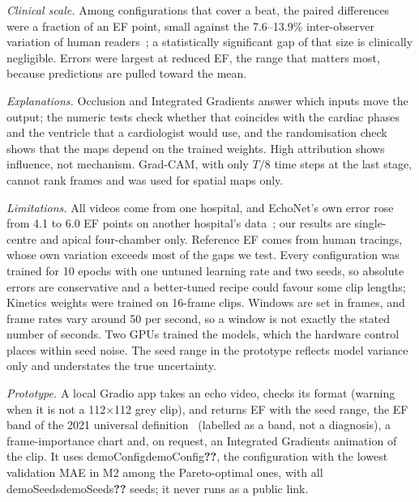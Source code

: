 \documentclass[conference]{IEEEtran}
\newcommand{\res}[1]{\ifcsname #1\endcsname\csname #1\endcsname\else\textbf{??}\fi}
\begin{document}
\emph{Clinical scale.} Among configurations that cover a beat, the paired differences were a
fraction of an EF point, small against the 7.6--13.9\% inter-observer variation of human
readers~\cite{ouyang2020nature}; a statistically significant gap of that size is clinically
negligible. Errors were largest at reduced EF, the range that matters most, because predictions
are pulled toward the mean.

\emph{Explanations.} Occlusion and Integrated Gradients answer which inputs move the output;
the numeric tests check whether that coincides with the cardiac phases and the ventricle that a
cardiologist would use, and the randomisation check shows that the maps depend on the trained
weights. High attribution shows influence, not mechanism. Grad-CAM, with only $T/8$ time steps
at the last stage, cannot rank frames and was used for spatial maps only.

\emph{Limitations.} All videos come from one hospital, and EchoNet's own error rose from 4.1 to
6.0 EF points on another hospital's data~\cite{ouyang2020nature}; our results are single-centre
and apical four-chamber only. Reference EF comes from human tracings, whose own variation exceeds
most of the gaps we test. Every configuration was trained for 10 epochs with one untuned learning
rate and two seeds, so absolute errors are conservative and a better-tuned recipe could favour
some clip lengths; Kinetics weights were trained on 16-frame clips. Windows are set in frames,
and frame rates vary around 50 per second, so a window is not exactly the stated number of
seconds. Two GPUs trained the models, which the hardware control places within seed noise. The
seed range in the prototype reflects model variance only and understates the true uncertainty.

\emph{Prototype.} A local Gradio app takes an echo video, checks its format (warning when it is
not a 112$\times$112 grey clip), and returns EF with the seed range, the EF band of the 2021
universal definition~\cite{bozkurt2021universal} (labelled as a band, not a diagnosis), a
frame-importance chart and, on request, an Integrated Gradients animation of the clip. It uses
\res{demoConfig}, the configuration with the lowest validation MAE in M2 among the Pareto-optimal
ones, with all \res{demoSeeds} seeds; it never runs as a public link.
\end{document}
